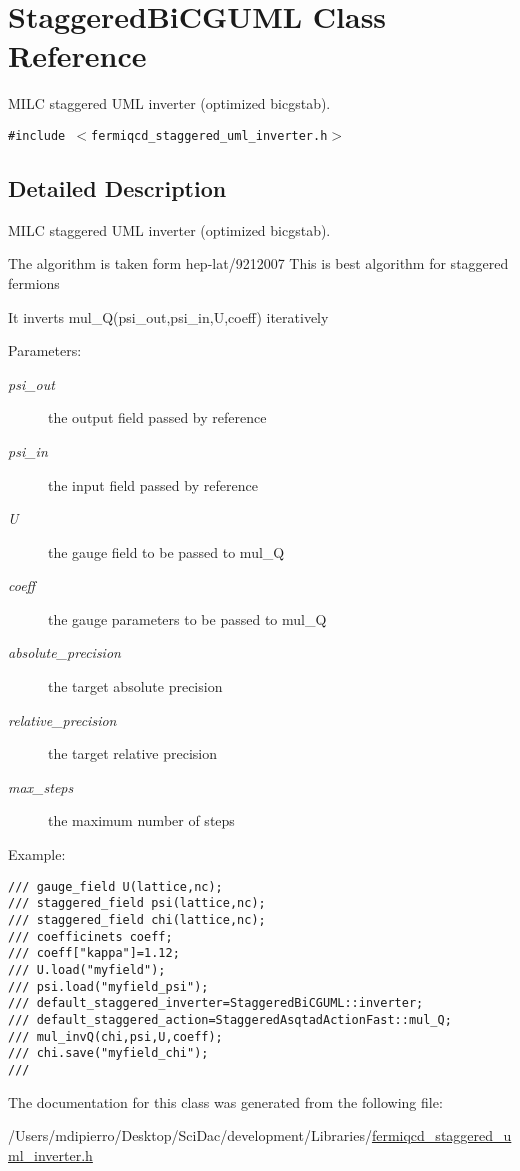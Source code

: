 \hypertarget{class_staggered_bi_c_g_u_m_l}{
\section{StaggeredBiCGUML Class Reference}
\label{class_staggered_bi_c_g_u_m_l}
}
MILC staggered UML inverter (optimized bicgstab).  


{\tt \#include $<$fermiqcd\_\-staggered\_\-uml\_\-inverter.h$>$}



\subsection{Detailed Description}
MILC staggered UML inverter (optimized bicgstab). 

The algorithm is taken form hep-lat/9212007 This is best algorithm for staggered fermions

It inverts mul\_\-Q(psi\_\-out,psi\_\-in,U,coeff) iteratively \begin{Desc}
\item[Parameters:]
\begin{description}
\item[{\em psi\_\-out}]the output field passed by reference \item[{\em psi\_\-in}]the input field passed by reference \item[{\em U}]the gauge field to be passed to mul\_\-Q \item[{\em coeff}]the gauge parameters to be passed to mul\_\-Q \item[{\em absolute\_\-precision}]the target absolute precision \item[{\em relative\_\-precision}]the target relative precision \item[{\em max\_\-steps}]the maximum number of steps\end{description}
\end{Desc}
Example: 

\footnotesize\begin{verbatim}
/// gauge_field U(lattice,nc);
/// staggered_field psi(lattice,nc);
/// staggered_field chi(lattice,nc);
/// coefficinets coeff;
/// coeff["kappa"]=1.12;
/// U.load("myfield");
/// psi.load("myfield_psi");
/// default_staggered_inverter=StaggeredBiCGUML::inverter;
/// default_staggered_action=StaggeredAsqtadActionFast::mul_Q;
/// mul_invQ(chi,psi,U,coeff);
/// chi.save("myfield_chi");
/// \end{verbatim}
\normalsize
 

The documentation for this class was generated from the following file:\begin{CompactItemize}
\item 
/Users/mdipierro/Desktop/SciDac/development/Libraries/\hyperlink{fermiqcd__staggered__uml__inverter_8h}{fermiqcd\_\-staggered\_\-uml\_\-inverter.h}\end{CompactItemize}
